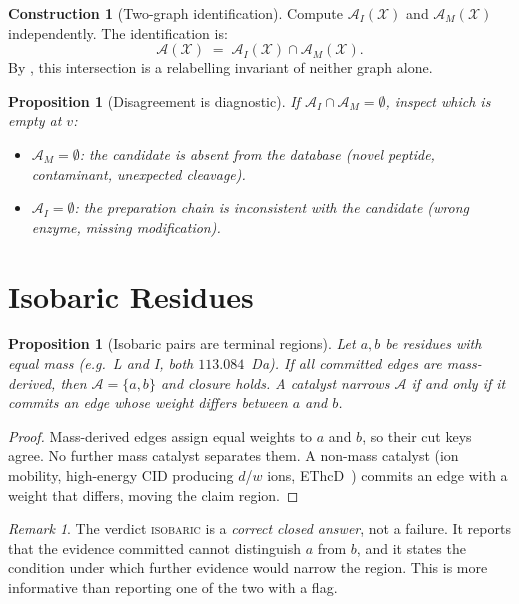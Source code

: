 \documentclass[11pt,a4paper]{article}
\newtheorem{proposition}[theorem]{Proposition}
\theoremstyle{definition}
\newtheorem{construction}[theorem]{Construction}
\theoremstyle{remark}
\newtheorem{remark}[theorem]{Remark}
\newcommand{\amb}{\mathcal{A}}
\newcommand{\Spec}{\mathcal{X}}
\begin{document}
\begin{construction}[Two-graph identification]
\label{con:twograph}
Compute $\amb_I(\Spec)$ and $\amb_M(\Spec)$ independently. The
identification is:
\[
  \amb(\Spec) \;=\; \amb_I(\Spec)\cap\amb_M(\Spec).
\]
By , this intersection is a relabelling invariant
of neither graph alone.
\end{construction}

\begin{proposition}[Disagreement is diagnostic]
\label{prop:disagree}
If $\amb_I\cap\amb_M=\emptyset$, inspect which is empty at $v$:
\begin{itemize}[itemsep=1pt]
  \item $\amb_M=\emptyset$: the candidate is absent from the database
  (novel peptide, contaminant, unexpected cleavage).
  \item $\amb_I=\emptyset$: the preparation chain is inconsistent
  with the candidate (wrong enzyme, missing modification).
\end{itemize}
\end{proposition}

\section{Isobaric Residues}
\label{sec:isobaric}

\begin{proposition}[Isobaric pairs are terminal regions]
\label{prop:isobaric}
Let $a,b$ be residues with equal mass (e.g.\ L and I, both
$113.084$~Da). If all committed edges are mass-derived, then
$\amb=\{a,b\}$ and closure holds. A catalyst narrows $\amb$ if and only
if it commits an edge whose weight differs between $a$ and $b$.
\end{proposition}

\begin{proof}
Mass-derived edges assign equal weights to $a$ and $b$, so their cut
keys agree. No further mass catalyst separates them. A non-mass catalyst
(ion mobility, high-energy CID producing $d$/$w$ ions,
EThcD~\citep{xiao2016distinguishing,zhokhov2017distinguishing})
commits an edge with a weight that differs, moving the claim region.
\end{proof}

\begin{remark}
The verdict \textsc{isobaric} is a \emph{correct closed answer}, not a
failure. It reports that the evidence committed cannot distinguish $a$
from $b$, and it states the condition under which further evidence would
narrow the region. This is more informative than reporting one of the
two with a flag.
\end{remark}
\end{document}
